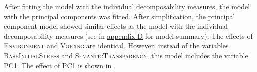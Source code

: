     \begin{table}[H]
    	\caption{ Summary of linear model for variables predicting the relative  duration of [s] in prefixed words with voiceless /s/}
    	\label{tbl: summary model7}
    	\begin{center}
    	\end{center}
    \end{table}



After fitting the model with the individual decomposability measures, the model with the principal components was fitted. After simplification, the principal component model showed similar effects as the model with the individual decomposability measures (see  in \hyperref[Appendix D: model summaries corpus]{appendix D} for model summary). The effects of \textsc{Environment} and \textsc{Voicing} are identical. However, instead of the variables \textsc{BaseInitialStress} and \textsc{SemanticTransparency}, this model includes the variable \textsc{PC1}. 
The effect of \textsc{PC1} is shown in . 



